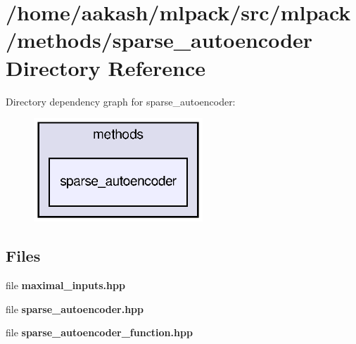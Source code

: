 \section{/home/aakash/mlpack/src/mlpack/methods/sparse\+\_\+autoencoder Directory Reference}
\label{dir_26bd3aa1fbc5e44d8d68d3fa31d9d0ed}
Directory dependency graph for sparse\+\_\+autoencoder\+:
\nopagebreak
\begin{figure}[H]
\begin{center}
\leavevmode
\includegraphics[width=180pt]{dir_26bd3aa1fbc5e44d8d68d3fa31d9d0ed_dep}
\end{center}
\end{figure}
\subsection*{Files}
\begin{DoxyCompactItemize}
\item 
file \textbf{ maximal\+\_\+inputs.\+hpp}
\item 
file \textbf{ sparse\+\_\+autoencoder.\+hpp}
\item 
file \textbf{ sparse\+\_\+autoencoder\+\_\+function.\+hpp}
\end{DoxyCompactItemize}
